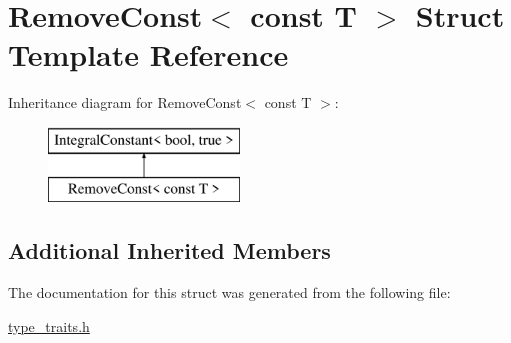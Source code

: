 \hypertarget{struct_remove_const_3_01const_01_t_01_4}{}\section{Remove\+Const$<$ const T $>$ Struct Template Reference}
\label{struct_remove_const_3_01const_01_t_01_4}
Inheritance diagram for Remove\+Const$<$ const T $>$\+:\begin{figure}[H]
\begin{center}
\leavevmode
\includegraphics[height=2.000000cm]{struct_remove_const_3_01const_01_t_01_4}
\end{center}
\end{figure}
\subsection*{Additional Inherited Members}


The documentation for this struct was generated from the following file\+:\begin{DoxyCompactItemize}
\item 
\hyperlink{type__traits_8h}{type\+\_\+traits.\+h}\end{DoxyCompactItemize}
